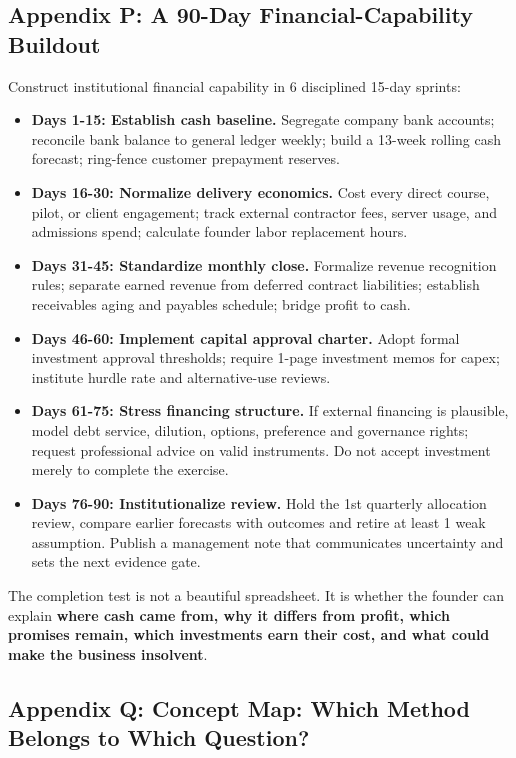 \subsection{Appendix P: A 90-Day Financial-Capability Buildout}

Construct institutional financial capability in 6 disciplined 15-day sprints:

\begin{itemize}
    \item \textbf{Days 1-15: Establish cash baseline.} Segregate company bank accounts; reconcile bank balance to general ledger weekly; build a 13-week rolling cash forecast; ring-fence customer prepayment reserves.
    \item \textbf{Days 16-30: Normalize delivery economics.} Cost every direct course, pilot, or client engagement; track external contractor fees, server usage, and admissions spend; calculate founder labor replacement hours.
    \item \textbf{Days 31-45: Standardize monthly close.} Formalize revenue recognition rules; separate earned revenue from deferred contract liabilities; establish receivables aging and payables schedule; bridge profit to cash.
    \item \textbf{Days 46-60: Implement capital approval charter.} Adopt formal investment approval thresholds; require 1-page investment memos for capex; institute hurdle rate and alternative-use reviews.
    \item \textbf{Days 61-75: Stress financing structure.} If external financing is plausible, model debt service, dilution, options, preference and governance rights; request professional advice on valid instruments. Do not accept investment merely to complete the exercise.
    \item \textbf{Days 76-90: Institutionalize review.} Hold the 1st quarterly allocation review, compare earlier forecasts with outcomes and retire at least 1 weak assumption. Publish a management note that communicates uncertainty and sets the next evidence gate.
\end{itemize}

The completion test is not a beautiful spreadsheet. It is whether the founder can explain \textbf{where cash came from, why it differs from profit, which promises remain, which investments earn their cost, and what could make the business insolvent}.

\subsection{Appendix Q: Concept Map: Which Method Belongs to Which Question?}

